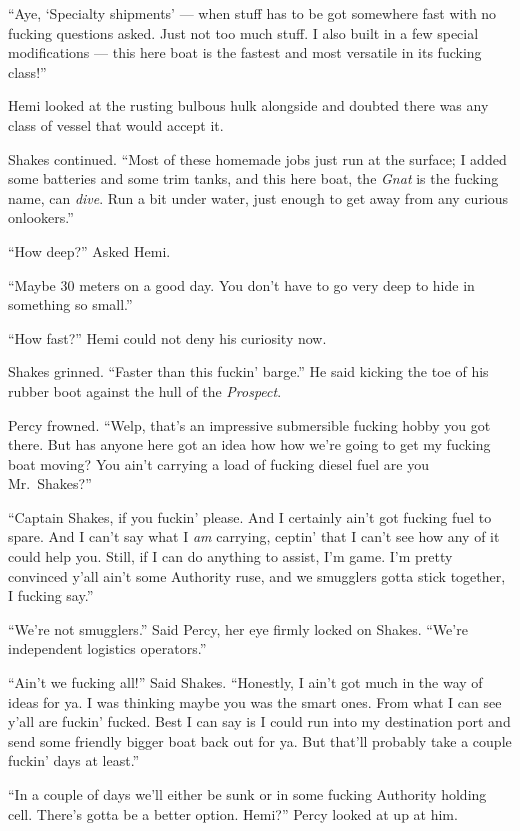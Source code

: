 \documentclass[
]{scrbook}
\begin{document}
``Aye, `Specialty shipments' --- when stuff has to be got somewhere fast
with no fucking questions asked. Just not too much stuff. I also built
in a few special modifications --- this here boat is the fastest and
most versatile in its fucking class!''

Hemi looked at the rusting bulbous hulk alongside and doubted there was
any class of vessel that would accept it.

Shakes continued. ``Most of these homemade jobs just run at the surface;
I added some batteries and some trim tanks, and this here boat, the
\emph{Gnat} is the fucking name, can \emph{dive}. Run a bit under water,
just enough to get away from any curious onlookers.''

``How deep?'' Asked Hemi.

``Maybe 30 meters on a good day. You don't have to go very deep to hide
in something so small.''

``How fast?'' Hemi could not deny his curiosity now.

Shakes grinned. ``Faster than this fuckin' barge.'' He said kicking the
toe of his rubber boot against the hull of the \emph{Prospect}.

Percy frowned. ``Welp, that's an impressive submersible fucking hobby
you got there. But has anyone here got an idea how how we're going to
get my fucking boat moving? You ain't carrying a load of fucking diesel
fuel are you Mr.~Shakes?''

``Captain Shakes, if you fuckin' please. And I certainly ain't got
fucking fuel to spare. And I can't say what I \emph{am} carrying,
ceptin' that I can't see how any of it could help you. Still, if I can
do anything to assist, I'm game. I'm pretty convinced y'all ain't some
Authority ruse, and we smugglers gotta stick together, I fucking say.''

``We're not smugglers.'' Said Percy, her eye firmly locked on Shakes.
``We're independent logistics operators.''

``Ain't we fucking all!'' Said Shakes. ``Honestly, I ain't got much in
the way of ideas for ya. I was thinking maybe you was the smart ones.
From what I can see y'all are fuckin' fucked. Best I can say is I could
run into my destination port and send some friendly bigger boat back out
for ya. But that'll probably take a couple fuckin' days at least.''

``In a couple of days we'll either be sunk or in some fucking Authority
holding cell. There's gotta be a better option. Hemi?'' Percy looked at
up at him.
\end{document}
